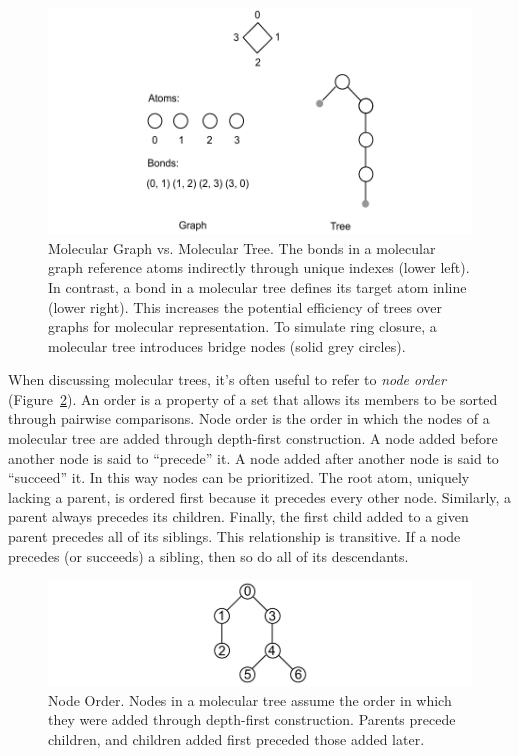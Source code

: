 \documentclass{article}
\begin{document}
\begin{figure}
    \centering
    \includegraphics[width=\columnwidth]{molecular-graph-vs-tree.pdf}
    \caption{Molecular Graph vs. Molecular Tree. The bonds in a molecular graph reference atoms indirectly through unique indexes (lower left). In contrast, a bond in a molecular tree defines its target atom inline (lower right). This increases the potential efficiency of trees over graphs for molecular representation. To simulate ring closure, a molecular tree introduces bridge nodes (solid grey circles).}
    \label{fig:molecular-graph-vs-tree}
\end{figure}

When discussing molecular trees, it's often useful to refer to \textit{node order} (Figure~\ref{fig:node-order}). An order is a property of a set that allows its members to be sorted through pairwise comparisons. Node order is the order in which the nodes of a molecular tree are added through depth-first construction. A node added before another node is said to \enquote{precede} it. A node added after another node is said to \enquote{succeed} it. In this way nodes can be prioritized. The root atom, uniquely lacking a parent, is ordered first because it precedes every other node. Similarly, a parent always precedes its children. Finally, the first child added to a given parent precedes all of its siblings. This relationship is transitive. If a node precedes (or succeeds) a sibling, then so do all of its descendants.

\begin{figure}
    \centering
    \includegraphics[width=\columnwidth]{node-order.pdf}
    \caption{Node Order. Nodes in a molecular tree assume the order in which they were added through depth-first construction. Parents precede children, and children added first preceded those added later.}
    \label{fig:node-order}
\end{figure}
\end{document}
